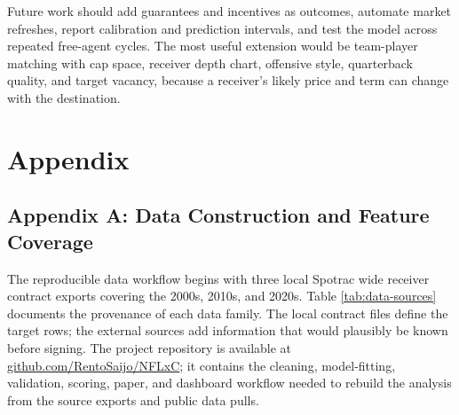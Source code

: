 \documentclass[
  10pt,
]{article}
\begin{document}
Future work should add guarantees and incentives as outcomes, automate market refreshes, report calibration and prediction intervals, and test the model across repeated free-agent cycles. The most useful extension would be team-player matching with cap space, receiver depth chart, offensive style, quarterback quality, and target vacancy, because a receiver's likely price and term can change with the destination.

\newpage

\section{Appendix}\label{appendix}

\subsection{Appendix A: Data Construction and Feature Coverage}\label{appendix-a-data-construction-and-feature-coverage}

\begin{table}[H]
\centering
\caption{\label{tab:data-sources-table}\label{tab:data-sources} Data sources and how each source enters the project.}
\centering
{}
\end{table}

The reproducible data workflow begins with three local Spotrac wide receiver contract exports covering the 2000s, 2010s, and 2020s. Table \ref{tab:data-sources} documents the provenance of each data family. The local contract files define the target rows; the external sources add information that would plausibly be known before signing. The project repository is available at \href{https://github.com/RentoSaijo/NFLxC}{github.com/RentoSaijo/NFLxC}; it contains the cleaning, model-fitting, validation, scoring, paper, and dashboard workflow needed to rebuild the analysis from the source exports and public data pulls.
\end{document}
